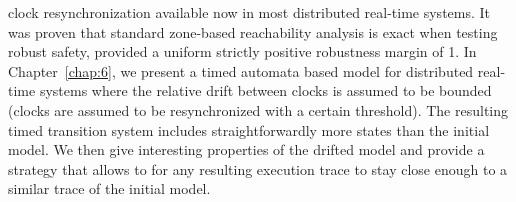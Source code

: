 clock resynchronization available now in most distributed real-time systems. It was proven
that standard zone-based reachability analysis  is exact when testing robust safety, provided
a uniform strictly positive robustness margin of 1.
In Chapter~\ref{chap:6}, we present a timed automata based model for distributed real-time
systems where the relative drift between clocks is assumed to be bounded (clocks are assumed
to be resynchronized with a certain threshold). The resulting timed transition system 
includes straightforwardly more states than the initial model. We then give interesting 
properties of the drifted model and provide a strategy that allows to for any resulting 
execution trace to stay close enough to a similar trace of the initial model. 
